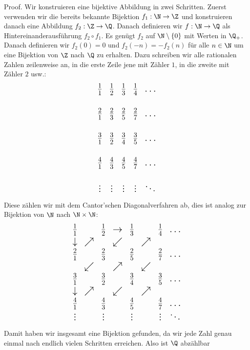 \documentclass[letterpaper,10pt,english]{jupyterBook}
\begin{document}
\begin{emphBox}{}{}
Proof.  Wir konstruieren eine bijektive Abbildung in zwei Schritten. Zuerst verwenden wir die bereits bekannte Bijektion \(f_1 : \N \rightarrow \Z\) und konstruieren danach eine Abbildung \(f_2: \Z \rightarrow \Q\). Danach definieren wir \(f: \N \rightarrow \Q\) als Hintereinanderausführung \(f_2 \circ f_1\).
Es genügt \(f_2\) auf \(\N \setminus \{0\}\) mit Werten in \(\Q_+\). Danach definieren wir \(f_2(0)=0\) und \(f_2(-n)=-f_2(n)\) für alle \(n \in \N\) um eine Bijektion von \(\Z\) nach \(\Q\) zu erhalten. Dazu schreiben wir alle rationalen Zahlen zeilenweise an, in die erste Zeile jene mit Zähler \(1\), in die zweite mit Zähler \(2\) usw.:
\begin{equation*}
{\Large 
\begin{matrix}  
\frac{1}1 & \frac{1}2 & \frac{1}3 & \frac{1}4 & \ldots  \\
& & & &\\
\frac{2}1 & \frac{2}3 & \frac{2}5 & \frac{2}7 & \ldots \\
& & & &\\
\frac{3}1 & \frac{3}2 & \frac{3}4 & \frac{3}5 & \ldots \\
& & & &\\
\frac{4}1 & \frac{4}3 & \frac{4}5 & \frac{4}7 & \ldots \\
& & & &\\
\vdots & \vdots & \vdots & \vdots & \ddots
\end{matrix}}
\end{equation*}
Diese zählen wir mit dem Cantor’schen Diagonalverfahren ab, dies ist analog zur Bijektion von \(\N\) nach \(\N \times \N\):
\begin{equation*}
{\Large 
 \begin{matrix}    
\frac{1}1 & & \frac{1}2 & \rightarrow &\frac{1}3 & &\frac{1}4 & \ldots  \\
\downarrow & \nearrow & & \swarrow  & & \nearrow & & \\
\frac{2}1 & &\frac{2}3 & &\frac{2}5 & &\frac{2}7 & \ldots \\
& \swarrow & & \nearrow&&  \swarrow & & \\
\frac{3}1 & &\frac{3}2 & &\frac{3}4 & &\frac{3}5 & \ldots \\
\downarrow & \nearrow & & \swarrow  & & \nearrow & & \\
\frac{4}1 & &\frac{4}3 & &\frac{4}5 & &\frac{4}7 & \ldots \\
\vdots & &\vdots & &\vdots & & \vdots & \ddots
\end{matrix}}
\end{equation*}
Damit haben wir insgesamt eine Bijektion gefunden, da wir jede Zahl genau einmal nach endlich vielen Schritten erreichen. Also ist \(\Q\) abzählbar
\end{emphBox}
\end{document}
